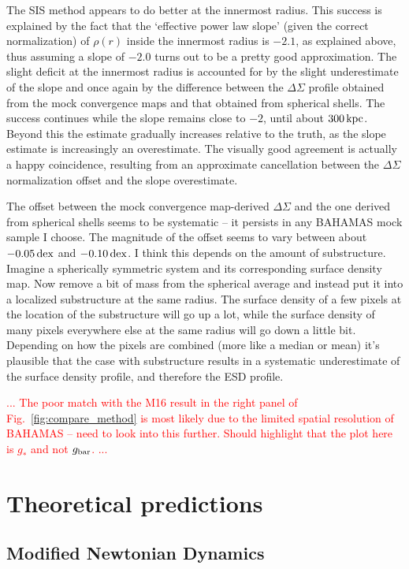 \documentclass[usenatbib]{mnras}
\newcommand{\un}[1]{_{\rm #1}}
\newcommand{\dex}{\, {\rm dex}}
\begin{document}
The SIS method appears to do better at the innermost radius. This success is explained by the fact that the `effective power law slope' (given the correct normalization) of $\rho(r)$ inside the innermost radius is $-2.1$, as explained above, thus assuming a slope of $-2.0$ turns out to be a pretty good approximation. The slight deficit at the innermost radius is accounted for by the slight underestimate of the slope and once again by the difference between the $\Delta\Sigma$ profile obtained from the mock convergence maps and that obtained from spherical shells. The success continues while the slope remains close to $-2$, until about $300\,{\rm kpc}$. Beyond this the estimate gradually increases relative to the truth, as the slope estimate is increasingly an overestimate. The visually good agreement is actually a happy coincidence, resulting from an approximate cancellation between the $\Delta\Sigma$ normalization offset and the slope overestimate.

The offset between the mock convergence map-derived $\Delta\Sigma$ and the one derived from spherical shells seems to be systematic -- it persists in any BAHAMAS mock sample I choose. The magnitude of the offset seems to vary between about $-0.05 \dex$ and $-0.10 \dex$. I think this depends on the amount of substructure. Imagine a spherically symmetric system and its corresponding surface density map. Now remove a bit of mass from the spherical average and instead put it into a localized substructure at the same radius. The surface density of a few pixels at the location of the substructure will go up a lot, while the surface density of many pixels everywhere else at the same radius will go down a little bit. Depending on how the pixels are combined (more like a median or mean) it's plausible that the case with substructure results in a systematic underestimate of the surface density profile, and therefore the ESD profile.

\textcolor{red}{... The poor match with the M16 result in the right panel of Fig.~\ref{fig:compare_method} is most likely due to the limited spatial resolution of BAHAMAS -- need to look into this further. Should highlight that the plot here is $g_*$ and not $g\un{bar}$. ...}

\section{Theoretical predictions}
\label{sec:theories}

\subsection{Modified Newtonian Dynamics}
\label{sec:MOND}
\end{document}
